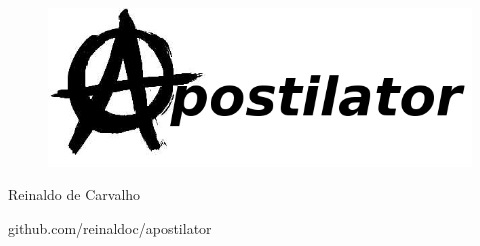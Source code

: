 \thispagestyle{empty}

\begin{center}
  \begin{figure}[H]
    \begin{center}
      \hspace{-1cm}
      \includegraphics[width=0.55\columnwidth]{titlepage.png}
    \end{center}      
  \end{figure}

  \vskip 2cm

  \hspace{-1cm}
  \begin{minipage}[c]{12cm}
    \begin{center}

{\huge {}\vskip 0.15cm %

{\small Reinaldo de Carvalho} %
}
    \end{center}
  \end{minipage}

  \vskip 16cm

  {\huge github.com/reinaldoc/apostilator} %

\end{center}
